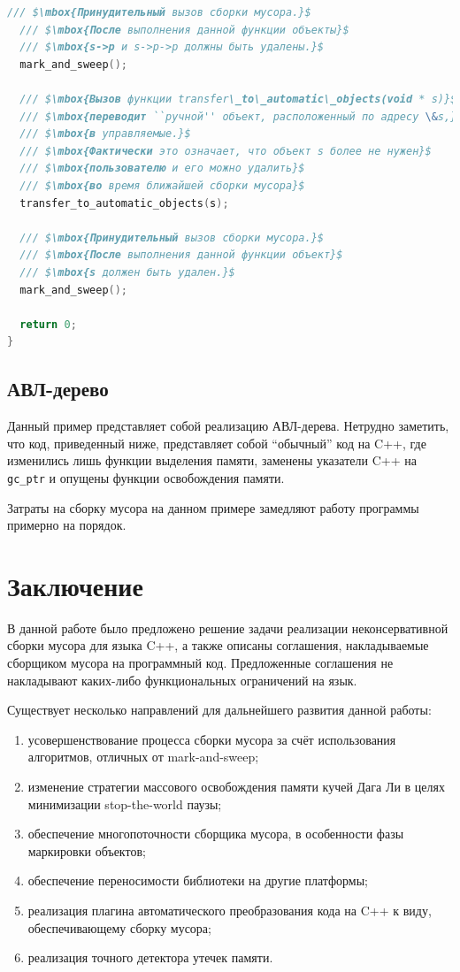 \begin{lstlisting}[language=cpp, mathescape=true]
  /// $\mbox{Принудительный вызов сборки мусора.}$
  /// $\mbox{После выполнения данной функции объекты}$
  /// $\mbox{s->p и s->p->p должны быть удалены.}$
  mark_and_sweep();
  
  /// $\mbox{Вызов функции transfer\_to\_automatic\_objects(void * s)}$
  /// $\mbox{переводит ``ручной'' объект, расположенный по адресу \&s,}$
  /// $\mbox{в управляемые.}$
  /// $\mbox{Фактически это означает, что объект s более не нужен}$
  /// $\mbox{пользователю и его можно удалить}$
  /// $\mbox{во время ближайшей сборки мусора}$
  transfer_to_automatic_objects(s);
  
  /// $\mbox{Принудительный вызов сборки мусора.}$
  /// $\mbox{После выполнения данной функции объект}$
  /// $\mbox{s должен быть удален.}$
  mark_and_sweep();

  return 0;
}
\end{lstlisting}

\subsection{АВЛ-дерево}
Данный пример представляет собой реализацию АВЛ-дерева.
Нетрудно заметить, что код, приведенный ниже, представляет собой ``обычный'' код на C++, где
изменились лишь функции выделения памяти, заменены указатели C++ на \lstinline[language= cpp]{gc_ptr}
и опущены функции освобождения памяти.



Затраты на сборку мусора на данном примере замедляют работу программы примерно на порядок.

\section*{Заключение}

В данной работе было предложено решение задачи реализации неконсервативной сборки мусора для языка C++,
а также описаны соглашения, накладываемые сборщиком мусора на программный код.
Предложенные соглашения не накладывают каких-либо функциональных ограничений на язык.

Существует несколько направлений для дальнейшего развития данной работы:
\begin{enumerate}
\item усовершенствование процесса сборки мусора за счёт использования алгоритмов, отличных от mark-and-sweep;
\item изменение стратегии массового освобождения памяти кучей Дага Ли в целях минимизации stop-the-world паузы;
\item обеспечение многопоточности сборщика мусора, в особенности фазы маркировки объектов;
\item обеспечение переносимости библиотеки на другие платформы;
\item реализация плагина автоматического преобразования кода на C++ к виду, обеспечивающему сборку мусора;
\item реализация точного детектора утечек памяти.
\end{enumerate}

